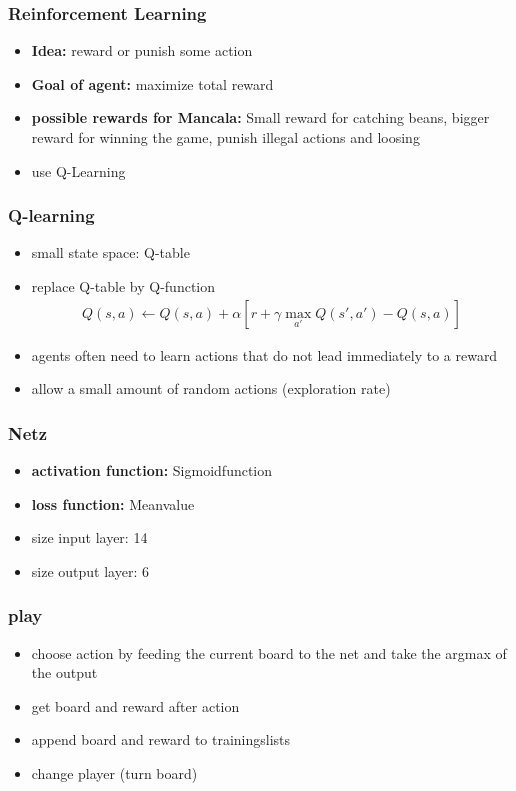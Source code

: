 \documentclass{beamer}
\begin{document}
 \begin{frame}
 \frametitle{Reinforcement Learning}
 \begin{itemize}
 \item \textbf{Idea:} reward or punish some action
 \item \textbf{Goal of agent:} maximize total reward
 \item \textbf{possible rewards for Mancala:} Small reward for catching beans, bigger reward for winning the game, punish illegal actions and loosing
 \item use Q-Learning
 \end{itemize}
 \end{frame}
 
  \begin{frame}
  \frametitle{Q-learning}
 \begin{itemize}
 \item small state space: Q-table
  \item replace Q-table by Q-function 
  \begin{align}
  Q(s,a) \leftarrow Q(s,a)+\alpha [r+\gamma \max_{a'} Q(s',a') -Q(s,a)]
  \end{align}
 \item agents often need to learn actions that do not lead immediately to a reward
 \item allow a small amount of random actions (exploration rate)
 \end{itemize}
 \end{frame}
 
  \begin{frame}
 \frametitle{Netz}
\begin{itemize}
\item \textbf{activation function:} Sigmoidfunction
\item \textbf{loss function:} Meanvalue
\item size input layer: 14
\item size output layer: 6
\end{itemize}
 \end{frame}

  \begin{frame}
 \frametitle{play}
 \begin{itemize}
\item choose action by feeding the current board to the net and take the argmax of the output
\item get board and reward after action 
\item append board and reward to trainingslists
\item change player (turn board)
\end{itemize}
\end{frame}
 
\end{document}
